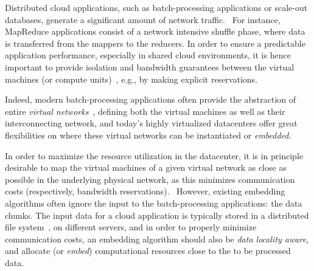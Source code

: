 \documentclass[9pt]{sigcomm-alternate}
\begin{document}

Distributed cloud applications, such as batch-processing applications or scale-out databases, generate a significant amount of network traffic.~\cite{talk-about}
For instance, MapReduce applications consist of a network intensive shuffle phase,
where data is transferred from the mappers to the reducers. 
In order to ensure a predictable application performance, especially in shared cloud environments,
it is hence important to provide isolation and bandwidth guarantees between the virtual machines (or compute units)~\cite{amazonbw},
e.g., by making explicit reservations.~\cite{oktopus}

Indeed, modern batch-processing applications often provide the abstraction of entire \emph{virtual networks}~\cite{talk-about},
defining both the virtual machines 
as well as their interconnecting network, and today's highly virtualized datacenters
offer great flexibilities on where these virtual networks
can be instantiated or \emph{embedded}. 

In order to maximize the resource utilization in the datacenter, it is in principle desirable to
map the virtual machines of a given virtual network as close as possible
in the underlying physical network, as this minimizes communication costs (respectively, bandwidth reservations).~\cite{oktopus,proteus}
However, existing embedding algorithms often ignore the input to the batch-processing applications:
the data chunks. The input data for a cloud application is typically stored in a distributed file system~\cite{hdfs}, on different servers,
and in order to properly minimize
communication costs, an embedding algorithm should also be \emph{data locality aware},
and allocate (or \emph{embed}) computational resources close to the to be processed data. 
\end{document}
